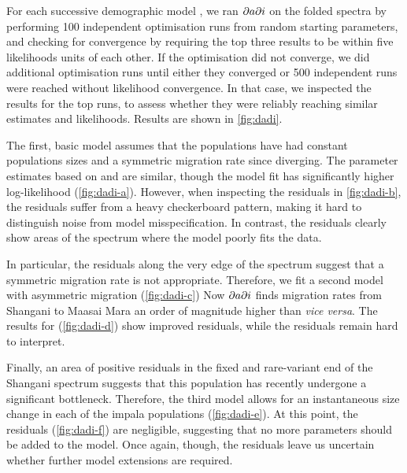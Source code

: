 For each successive demographic model \cite{Portik2017}, we ran $\partial a \partial i$ on the folded spectra by performing \num{100} independent optimisation runs from random starting parameters, and checking for convergence by requiring the top three results to be within five likelihoods units of each other.
If the optimisation did not converge, we did additional optimisation runs until either they converged or \num{500} independent runs were reached without likelihood convergence.
In that case, we inspected the results for the top runs, to assess whether they were reliably reaching similar estimates and likelihoods.
Results are shown in \cref{fig:dadi}.

The first, basic model assumes that the populations have had constant populations sizes and a symmetric migration rate since diverging.
The parameter estimates based on \realsfs and \winsfs are similar, though the \winsfs model fit has significantly higher log-likelihood (\cref{fig:dadi-a}).
However, when inspecting the residuals in \cref{fig:dadi-b}, the \realsfs residuals suffer from a heavy checkerboard pattern, making it hard to distinguish noise from model misspecification.
In contrast, the \winsfs residuals clearly show areas of the spectrum where the model poorly fits the data.

In particular, the residuals along the very edge of the spectrum suggest that a symmetric migration rate is not appropriate.
Therefore, we fit a second model with asymmetric migration (\cref{fig:dadi-c})
Now $\partial a \partial i$ finds migration rates from Shangani to Maasai Mara an order of magnitude higher than \emph{vice versa}.
The results for \winsfs (\cref{fig:dadi-d}) show improved residuals, while the \realsfs residuals remain hard to interpret.

Finally, an area of positive residuals in the fixed and rare-variant end of the Shangani spectrum suggests that this population has recently undergone a significant bottleneck.
Therefore, the third model allows for an instantaneous size change in each of the impala populations (\cref{fig:dadi-e}).
At this point, the \winsfs residuals (\cref{fig:dadi-f}) are negligible, suggesting that no more parameters should be added to the model.
Once again, though, the \realsfs residuals leave us uncertain whether further model extensions are required.

